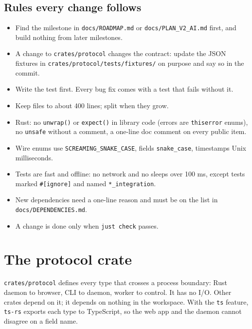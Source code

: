 \section{\texorpdfstring{Rules every change follows}{Rules every change follows}}

\begin{itemize}
\item Find the milestone in \texttt{docs/\allowbreak{}ROADMAP.\allowbreak{}md} or \texttt{docs/\allowbreak{}PLAN\_\allowbreak{}V2\_\allowbreak{}AI.\allowbreak{}md} first, and build nothing from later milestones.
\item A change to \texttt{crates/\allowbreak{}protocol} changes the contract: update the JSON fixtures in \texttt{crates/\allowbreak{}protocol/\allowbreak{}tests/\allowbreak{}fixtures/\allowbreak{}} on purpose and say so in the commit.
\item Write the test first. Every bug fix comes with a test that fails without it.
\item Keep files to about 400 lines; split when they grow.
\item Rust: no \texttt{unwrap()} or \texttt{expect()} in library code (errors are \texttt{thiserror} enums), no \texttt{unsafe} without a comment, a one-line doc comment on every public item.
\item Wire enums use \texttt{SCREAMING\_\allowbreak{}SNAKE\_\allowbreak{}CASE}, fields \texttt{snake\_\allowbreak{}case}, timestamps Unix milliseconds.
\item Tests are fast and offline: no network and no sleeps over 100 ms, except tests marked \texttt{\#[ignore]} and named \texttt{*\_\allowbreak{}integration}.
\item New dependencies need a one-line reason and must be on the list in \texttt{docs/\allowbreak{}DEPENDENCIES.\allowbreak{}md}.
\item A change is done only when \texttt{just\ check} passes.
\end{itemize}

\chapter{\texorpdfstring{The protocol crate}{The protocol crate}}

\texttt{crates/\allowbreak{}protocol} defines every type that crosses a process boundary: Rust daemon to browser, CLI to daemon, worker to control. It has no I/O. Other crates depend on it; it depends on nothing in the workspace. With the \texttt{ts} feature, \texttt{ts-{}\allowbreak{}rs} exports each type to TypeScript, so the web app and the daemon cannot disagree on a field name.

